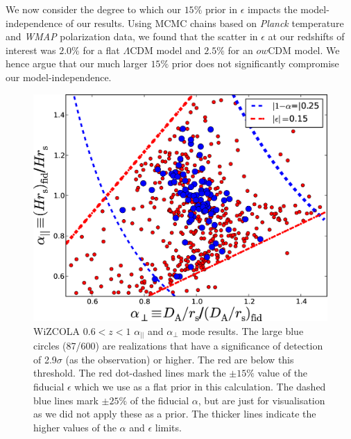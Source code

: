 \documentclass[iop,twocolappendix]{emulateapj}
\begin{document}
{We now consider the degree to which our $15\%$ prior in $\epsilon$
impacts the model-independence of our results.  Using MCMC chains
based on {\sl Planck} temperature and {\sl WMAP} polarization data, we
found that the scatter in $\epsilon$ at our redshifts of interest was
$2.0\%$ for a flat $\Lambda$CDM model and $2.5\%$ for an $ow$CDM
model.  We hence argue that our much larger $15\%$ prior does not
significantly compromise our model-independence.

\begin{figure}
\begin{center}
\includegraphics[width=0.7\columnwidth]{figures/WiZCOLA_mode_z0pt6_1pt0/WiZCOLA_mode_z0pt6_1pt0}
\caption{\label{fig:wizcola_hdaModes_z60_epsilonT15} WiZCOLA $0.6<z<1$ $\alpha_{||}$ and $\alpha_\perp$ mode results. The large blue circles (87/600) are realizations that have a significance of detection of 2.9$\sigma$ (as the observation) or higher. The red are below this threshold. The red dot-dashed lines mark the $\pm15\%$ value of the fiducial $\epsilon$ which we use as a flat prior in this calculation. The dashed blue lines mark $\pm25\%$ of the fiducial $\alpha$, but are just for visualisation as we did not apply these as a prior. The thicker lines indicate the higher values of the $\alpha$ and $\epsilon$ limits.%
}
\end{center}
\end{figure}

}
\end{document}
